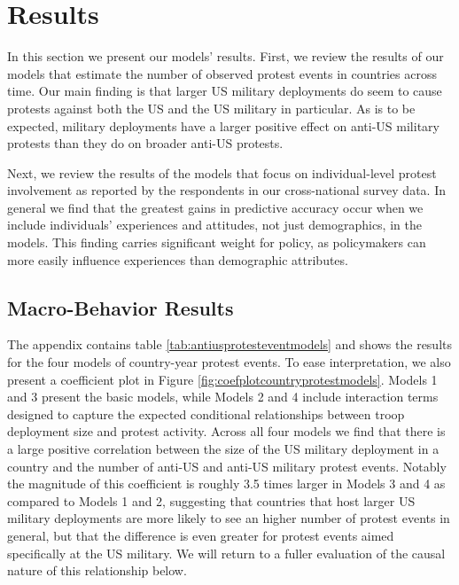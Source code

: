 \section*{Results}

In this section we present our models' results. First, we review the results of our models that estimate the number of observed protest events in countries across time. Our main finding is that larger US military deployments do seem to cause protests against both the US and the US military in particular. As is to be expected, military deployments have a larger positive effect on anti-US military protests than they do on broader anti-US protests.

Next, we review the results of the models that focus on individual-level protest involvement as reported by the respondents in our cross-national survey data. In general we find that the greatest gains in predictive accuracy occur when we include individuals' experiences and attitudes, not just demographics, in the models. This finding carries significant weight for policy, as policymakers can more easily influence experiences than demographic attributes. 

\subsection*{Macro-Behavior Results}

The appendix contains table \ref{tab:antiusprotesteventmodels} and shows the results for the four models of country-year protest events. To ease interpretation, we also present a coefficient plot in Figure \ref{fig:coefplotcountryprotestmodels}. Models 1 and 3 present the basic models, while Models 2 and 4 include interaction terms designed to capture the expected conditional relationships between troop deployment size and protest activity. Across all four models we find that there is a large positive correlation between the size of the US military deployment in a country and the number of anti-US and anti-US military protest events. Notably the magnitude of this coefficient is roughly 3.5 times larger in Models 3 and 4 as compared to Models 1 and 2, suggesting that countries that  host larger US military deployments are more likely to see an higher number of protest events in general, but that the difference is even greater for protest events aimed specifically at the US military. We will return to a fuller evaluation of the causal nature of this relationship below.




